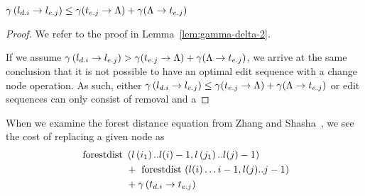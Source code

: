 


\begin{lemma}
    $\gamma\left(l_{{d}.{i}} \rightarrow l_{{e}.{j}}\right) \le \gamma(t_{{e}.{j}} \rightarrow {\Lambda}) + \gamma(\Lambda \rightarrow {t_{{e}.{j}}})$

    \begin{proof}
        We refer to the proof in Lemma~\ref{lem:gamma-delta-2}.

        If we assume $\gamma\left(l_{{d}.{i}} \rightarrow l_{{e}.{j}}\right) > \gamma(t_{{e}.{j}} \rightarrow {\Lambda}) + \gamma(\Lambda \rightarrow {t_{{e}.{j}}})$, we arrive at the same conclusion that it is not possible to have an optimal edit sequence with a change node operation. As such, either $\gamma\left(l_{{d}.{i}} \rightarrow l_{{e}.{j}}\right) \le \gamma(t_{{e}.{j}} \rightarrow {\Lambda}) + \gamma(\Lambda \rightarrow {t_{{e}.{j}}})$ or edit sequences can only consist of removal and a
    \end{proof}
\end{lemma}



When we examine the forest distance equation from Zhang and Shasha~\cite{zhang_simple_1989}, we see the cost of replacing a given node as
\begin{align*}
    \text { forestdist } & \left(l\left(i_1\right) . . l(i)-1, l\left(j_1\right) . . l(j)-1\right) \\
                         & + \text { forestdist }(l(i) \ldots i-1, l(j) . . j-1)                   \\
                         & + \gamma\left(t_{{d}.{i}} \rightarrow t_{{e}.{j}}\right)
\end{align*}


